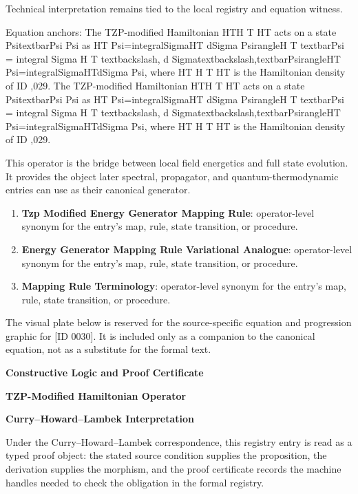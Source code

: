 Technical interpretation remains tied to the local registry and equation witness.

Equation anchors: The TZP-modified Hamiltonian HTH T HT acts on a state  PsitextbarPsi Psi as HT Psi=integralSigmaHT dSigma  PsirangleH T textbarPsi = integral Sigma H T textbackslash, d Sigmatextbackslash,textbarPsirangleHT Psi=integralSigmaHTdSigma Psi, where HT H T HT is the Hamiltonian density of ID ,029. The TZP-modified Hamiltonian HTH T HT acts on a state  PsitextbarPsi Psi as HT Psi=integralSigmaHT dSigma  PsirangleH T textbarPsi = integral Sigma H T textbackslash, d Sigmatextbackslash,textbarPsirangleHT Psi=integralSigmaHTdSigma Psi, where HT H T HT is the Hamiltonian density of ID ,029.

This operator is the bridge between local field energetics and full state evolution. It provides the object later spectral, propagator, and quantum-thermodynamic entries can use as their canonical generator.
\endgroup

\begingroup\footnotesize\sloppy
\begin{enumerate}[leftmargin=1.35em,itemsep=1pt,topsep=1pt,parsep=0pt]
\item \textbf{Tzp Modified Energy Generator Mapping Rule}: operator-level synonym for the entry's map, rule, state transition, or procedure.
\item \textbf{Energy Generator Mapping Rule Variational Analogue}: operator-level synonym for the entry's map, rule, state transition, or procedure.
\item \textbf{Mapping Rule Terminology}: operator-level synonym for the entry's map, rule, state transition, or procedure.
\end{enumerate}
\endgroup

\begingroup\footnotesize\sloppy
The visual plate below is reserved for the source-specific equation and progression graphic for [ID 0030]. It is included only as a companion to the canonical equation, not as a substitute for the formal text.
\par\endgroup
\ifTZPDarkEdition
{}
\fi

\clearpage
\begingroup\tzpsupportsetup
\noindent\textbf{\fontsize{10.8pt}{12.8pt}\selectfont [ID 0030] Constructive Logic and Proof Certificate}\par
\noindent\textbf{\fontsize{10pt}{12pt}\selectfont TZP-Modified Hamiltonian Operator}\par
\vspace{0.45em}
\begingroup
\footnotesize
\setlength{\parskip}{0.22em}
\setlength{\parindent}{0pt}
\noindent\textbf{Curry--Howard--Lambek Interpretation}\par
Under the Curry--Howard--Lambek correspondence, this registry entry is read as a typed proof
object: the stated source condition supplies the proposition, the derivation supplies the
morphism, and the proof certificate records the machine handles needed to check the obligation
in the formal registry.

